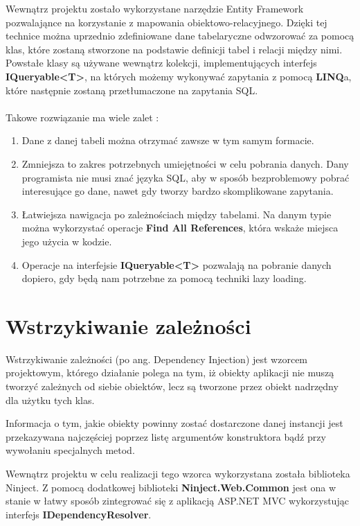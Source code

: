 Wewnątrz projektu zostało wykorzystane narzędzie Entity Framework pozwalająnce na korzystanie z mapowania obiektowo-relacyjnego. Dzięki tej technice można uprzednio zdefiniowane dane tabelaryczne odwzorować za pomocą klas, które zostaną stworzone na podstawie definicji tabel i relacji między nimi. Powstałe klasy są używane wewnątrz kolekcji, implementujących interfejs \textbf{IQueryable<T>}, na których możemy wykonywać zapytania z pomocą \textbf{LINQ}a, które następnie zostaną przetłumaczone na zapytania SQL.
\\ \\
Takowe rozwiązanie ma wiele zalet :
\begin{enumerate}
	\item Dane z danej tabeli można otrzymać zawsze w tym samym formacie.
	\item Zmniejsza to zakres potrzebnych umiejętności w celu pobrania danych. Dany programista nie musi znać języka SQL, aby w sposób bezproblemowy pobrać interesujące go dane, nawet gdy tworzy bardzo skomplikowane zapytania.
	\item Łatwiejsza nawigacja po zależnościach między tabelami. Na danym typie można wykorzystać operacje \textbf{Find All References}, która wskaże miejsca jego użycia w kodzie.
	\item Operacje na interfejsie \textbf{IQueryable<T>} pozwalają na pobranie danych dopiero, gdy będą nam potrzebne za pomocą techniki lazy loading.
\end{enumerate}

\section{Wstrzykiwanie zależności}

Wstrzykiwanie zależności (po ang. Dependency Injection) jest wzorcem projektowym, którego działanie polega na tym, iż obiekty aplikacji nie muszą tworzyć zależnych od siebie obiektów, lecz są tworzone przez obiekt nadrzędny dla użytku tych klas. 

Informacja o tym, jakie obiekty powinny zostać dostarczone danej instancji jest przekazywana najczęściej poprzez listę argumentów konstruktora bądź przy wywołaniu specjalnych metod.

Wewnątrz projektu w celu realizacji tego wzorca wykorzystana została biblioteka Ninject\cite{NinjectGithub}. Z pomocą dodatkowej biblioteki \textbf{Ninject.Web.Common} jest ona w stanie w łatwy sposób zintegrować się z aplikacją ASP.NET MVC wykorzystując interfejs \textbf{IDependencyResolver}. 

